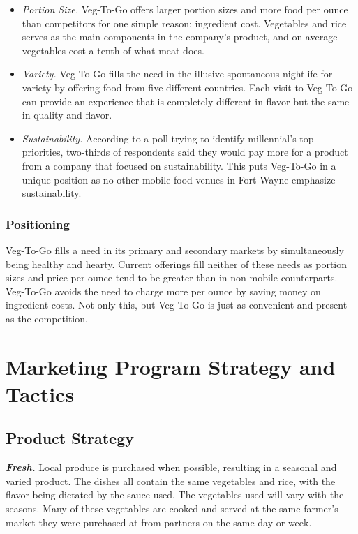 \documentclass[12pt, letterpaper]{article}
\newcommand{\companyname}{Veg-To-Go}
\begin{document}
\begin{itemize}
	\item \emph{Portion Size.}  \companyname{} offers larger portion sizes and more food per ounce than competitors for one simple reason: ingredient cost.  Vegetables and rice serves as the main components in the company's product, and on average vegetables cost a tenth of what meat does. \cite{costs}
	\item \emph{Variety.} \companyname{} fills the need in the illusive spontaneous nightlife for variety by offering food from five different countries.  Each visit to \companyname{} can provide an experience that is completely different in flavor but the same in quality and flavor.
	\item \emph{Sustainability.} According to a poll trying to identify millennial's top priorities, two-thirds of respondents said they would pay more for a product from a company that focused on sustainability. \cite{millennials} This puts \companyname{} in a unique position as no other mobile food venues in Fort Wayne emphasize sustainability.
\end{itemize}

\subsubsection{Positioning}
\companyname{} fills a need in its primary and secondary markets by simultaneously being healthy and hearty.  Current offerings fill neither of these needs as portion sizes and price per ounce tend to be greater than in non-mobile counterparts. \companyname{} avoids the need to charge more per ounce by saving money on ingredient costs.  Not only this, but \companyname{} is just as convenient and present as the competition.

\newpage

\section{Marketing Program Strategy and Tactics}
\subsection{Product Strategy}
\textbf{\emph{Fresh.}} Local produce is purchased when possible, resulting in a seasonal and varied product. The dishes all contain the same vegetables and rice, with the flavor being dictated by the sauce used. The vegetables used will vary with the seasons. Many of these vegetables are cooked and served at the same farmer's market they were purchased at from partners on the same day or week.
\end{document}
